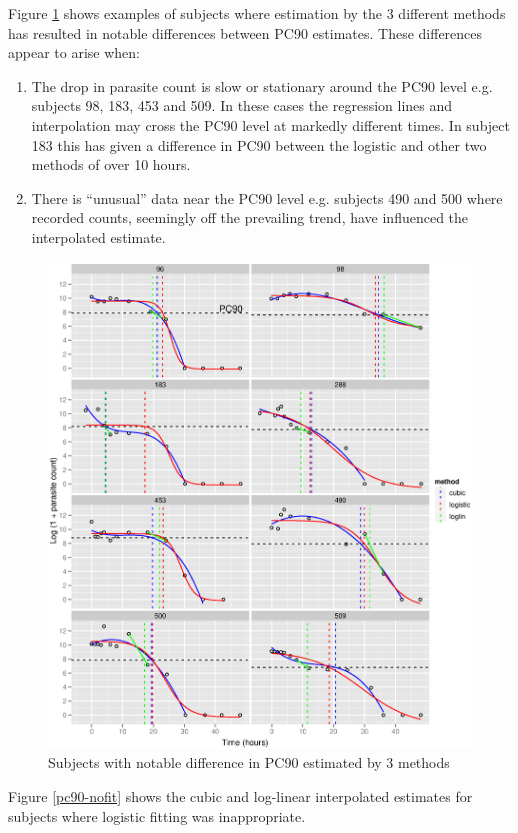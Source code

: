 Figure \ref{pc90-bad} shows examples of subjects where estimation by the 3 different methods has resulted in notable differences between PC90 estimates. These differences appear to arise when:
\begin{enumerate}
\item The drop in parasite count is slow or stationary around the PC90 level e.g. subjects 98, 183, 453 and 509. In these cases the regression lines and interpolation may cross the PC90 level at markedly different times. In subject 183 this has given a difference in PC90 between the logistic and other two methods of over 10 hours.
\item There is ``unusual'' data near the PC90 level e.g. subjects 490 and 500 where recorded counts, seemingly off the prevailing trend, have influenced the interpolated estimate.
\end{enumerate}
\begin{figure}[h]
\includegraphics[width=6.5in]{pc90-bad.eps} 
\caption{Subjects with notable difference in PC90 estimated by 3 methods}
\label{pc90-bad}
\end{figure}
Figure \ref{pc90-nofit} shows the cubic and log-linear interpolated estimates for subjects where logistic fitting was inappropriate.
